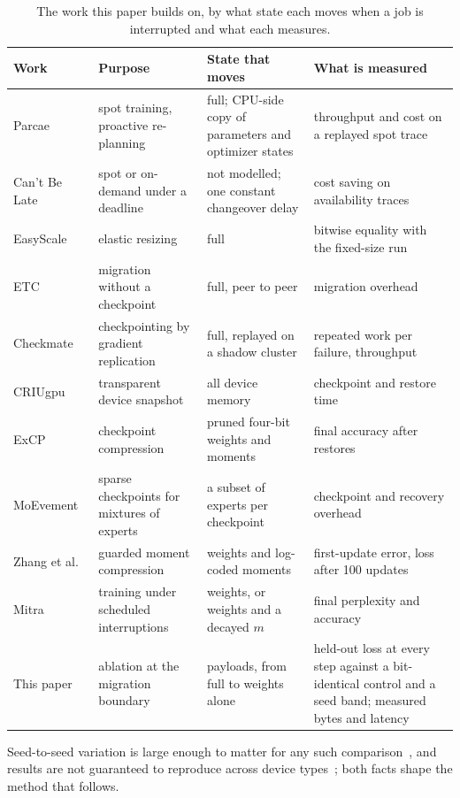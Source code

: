 \begin{table}[t]
\caption{The work this paper builds on, by what state each moves when a job is interrupted and what each measures.}
\label{tab:position}
\centering
\footnotesize
\begin{tabular}{@{}>{\raggedright}p{}>{\raggedright}p{}>{\raggedright}p{}>{\raggedright\arraybackslash}p{}@{}}
\toprule
Work & Purpose & State that moves & What is measured \\
\midrule
Parcae~\cite{duan2024parcae} & spot training, proactive re-planning & full; CPU-side copy of parameters and optimizer states & throughput and cost on a replayed spot trace \\\addlinespace[2pt]
Can't Be Late~\cite{wu2024cantbelate} & spot or on-demand under a deadline & not modelled; one constant changeover delay & cost saving on availability traces \\\addlinespace[2pt]
EasyScale~\cite{li2023easyscale} & elastic resizing & full & bitwise equality with the fixed-size run \\\addlinespace[2pt]
ETC~\cite{liu2026etc} & migration without a checkpoint & full, peer to peer & migration overhead \\\addlinespace[2pt]
Checkmate~\cite{bhardwaj2025checkmate} & checkpointing by gradient replication & full, replayed on a shadow cluster & repeated work per failure, throughput \\\addlinespace[2pt]
CRIUgpu~\cite{stoyanov2025criugpu} & transparent device snapshot & all device memory & checkpoint and restore time \\\addlinespace[2pt]
ExCP~\cite{li2024excp} & checkpoint compression & pruned four-bit weights and moments & final accuracy after restores \\\addlinespace[2pt]
MoEvement~\cite{gandhi2026moevement} & sparse checkpoints for mixtures of experts & a subset of experts per checkpoint & checkpoint and recovery overhead \\\addlinespace[2pt]
Zhang et al.~\cite{zhang2026guarded} & guarded moment compression & weights and log-coded moments & first-update error, loss after 100 updates \\\addlinespace[2pt]
Mitra~\cite{mitra2026orbittrace} & training under scheduled interruptions & weights, or weights and a decayed $m$ & final perplexity and accuracy \\
\midrule
This paper & ablation at the migration boundary & \nArms{} payloads, from full to weights alone & held-out loss at every step against a bit-identical control and a seed band; measured bytes and latency \\
\bottomrule
\end{tabular}
\end{table}

Seed-to-seed variation is large enough to matter for any such comparison~\cite{summers2021nondeterminism,
bouthillier2021variance,vanderwal2025polypythias}, and results are not guaranteed to reproduce across device
types~\cite{pytorch2026randomness,pham2020variance,zhuang2021randomness}; both facts shape the method that follows.
